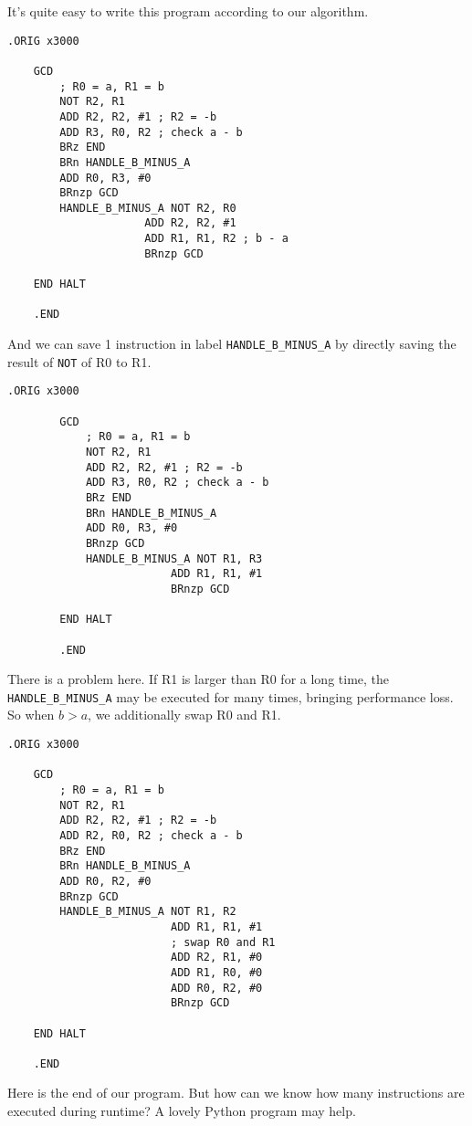 \documentclass{article}
\begin{document}
	It's quite easy to write this program according to our algorithm.
	
	\begin{lstlisting}[caption={My GCD 1, 1st version}]
	.ORIG x3000
	
	GCD
	    ; R0 = a, R1 = b
	    NOT R2, R1
	    ADD R2, R2, #1 ; R2 = -b
	    ADD R3, R0, R2 ; check a - b
	    BRz END
	    BRn HANDLE_B_MINUS_A
	    ADD R0, R3, #0
	    BRnzp GCD
	    HANDLE_B_MINUS_A NOT R2, R0
	    		     ADD R2, R2, #1
	    		     ADD R1, R1, R2 ; b - a
	    		     BRnzp GCD
	
	END HALT
	
	.END
	\end{lstlisting}
	
	And we can save 1 instruction in label \texttt{HANDLE\_B\_MINUS\_A} by directly saving the result of \texttt{NOT} of R0 to R1.
	
	\begin{lstlisting}[caption={My GCD 1, 2nd version}]
		.ORIG x3000
		
		GCD
		    ; R0 = a, R1 = b
		    NOT R2, R1
		    ADD R2, R2, #1 ; R2 = -b
		    ADD R3, R0, R2 ; check a - b
		    BRz END
		    BRn HANDLE_B_MINUS_A
		    ADD R0, R3, #0
		    BRnzp GCD
		    HANDLE_B_MINUS_A NOT R1, R3
		    		     ADD R1, R1, #1
		    		     BRnzp GCD
		
		END HALT
		
		.END
	\end{lstlisting}
	
	There is a problem here. If R1 is larger than R0 for a long time, the \texttt{HANDLE\_B\_MINUS\_A} may be executed for many times, bringing performance loss. So when $b > a$, we additionally swap R0 and R1.
	
	\begin{lstlisting}[caption={My GCD 1, 3rd version}]
	.ORIG x3000
	
	GCD
	    ; R0 = a, R1 = b
	    NOT R2, R1
	    ADD R2, R2, #1 ; R2 = -b
	    ADD R2, R0, R2 ; check a - b
	    BRz END
	    BRn HANDLE_B_MINUS_A
	    ADD R0, R2, #0
	    BRnzp GCD
	    HANDLE_B_MINUS_A NOT R1, R2
	                     ADD R1, R1, #1
	                     ; swap R0 and R1
	                     ADD R2, R1, #0
	                     ADD R1, R0, #0
	                     ADD R0, R2, #0
	                     BRnzp GCD
	
	END HALT

	.END
	\end{lstlisting}
	
	Here is the end of our program. But how can we know how many instructions are executed during runtime? A lovely Python program may help.
	
\end{document}
